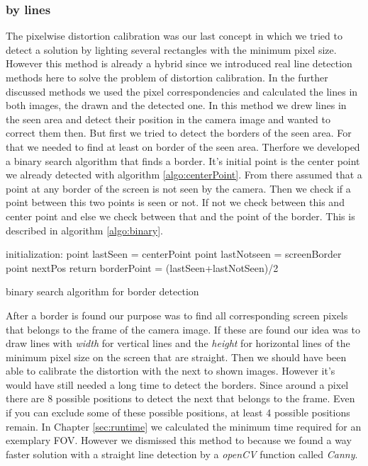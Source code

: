 \documentclass[journal,final,a4paper,twoside]{PS}
\begin{document}
\subsubsection{by lines}
The pixelwise distortion calibration was our last concept in which we tried to detect a solution by lighting several rectangles with the minimum pixel size. However this method is already a hybrid since we introduced real line detection methods here to solve the problem of distortion calibration. In the further discussed methods we used the pixel correspondencies and calculated the lines in both images, the drawn and the detected one. In this method we drew lines in the seen area and detect their position in the camera image and wanted to correct them then. But first we tried to detect the borders of the seen area. For that we needed to find at least on border of the seen area. Therfore we developed a binary search algorithm that finds a border. It's initial point is the center point we already detected with algorithm \ref{algo:centerPoint}. From there assumed that a point at any border of the screen is not seen by the camera. Then we check if a point between this two points is seen or not. If not we check between this and center point and else we check between that and the point of the border. This is described in algorithm \ref{algo:binary}.


\begin{algorithm}[h]
 initialization: \;
 point lastSeen = centerPoint\;
 point lastNotseen = screenBorder\;
 point nextPos\;
 return borderPoint = (lastSeen+lastNotSeen)/2\;
 \caption{binary search algorithm for border detection}
 \label{algo:binary}
\end{algorithm} 

After a border is found our purpose was to find all corresponding screen pixels that belongs to the frame of the camera image. If these are found our idea was to draw lines with \emph{width} for vertical lines and the \emph{height} for horizontal lines of the minimum pixel size on the screen that are straight. Then we should have been able to calibrate the distortion with the next to shown images. However it's would have still needed a long time to detect the borders. Since around a pixel there are 8 possible positions to detect the next that belongs to the frame. Even if you can exclude some of these possible positions, at least 4 possible positions remain. %
In Chapter \ref{sec:runtime} we calculated the minimum time required for an exemplary FOV. However we dismissed this method to because we found a way faster solution with a straight line detection by a \emph{openCV} function called \emph{Canny}. 
\end{document}

